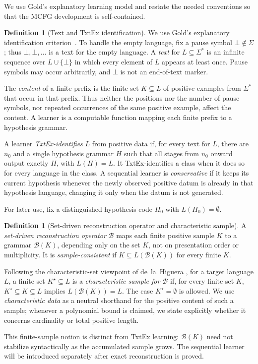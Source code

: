 \documentclass[11pt]{article}
\numberwithin{equation}{section}
\theoremstyle{plain}
\theoremstyle{definition}
\newtheorem{definition}[theorem]{Definition}
\theoremstyle{remark}
\newcommand{\pausesym}{\bot}
\begin{document}
We use Gold's explanatory learning model and restate the needed conventions
so that the MCFG development is self-contained.

\begin{definition}[Text and TxtEx identification]
We use Gold's explanatory identification criterion~\cite{Gold1967}.  To handle the empty language, fix a pause symbol
\(\pausesym\notin\Sigma\); thus
\(\pausesym,\pausesym,\ldots\) is a text for the empty language.
A \emph{text} for \(L\subseteq\Sigma^*\) is an infinite sequence over
\(L\cup\{\pausesym\}\) in which every element of \(L\) appears at least once.
Pause symbols may occur arbitrarily, and \(\pausesym\) is not an end-of-text marker.

The \emph{content} of a finite prefix is the finite set
\(K\subseteq L\) of positive examples from \(\Sigma^*\) that occur in that
prefix.  Thus neither the positions nor the number of pause symbols, nor repeated
occurrences of the same positive example, affect the content.
A learner is a computable function mapping each finite prefix to a hypothesis
grammar.

A learner \emph{TxtEx-identifies} \(L\) from positive data if, for every text
for \(L\), there are \(n_0\) and a single hypothesis grammar \(H\) such that
all stages from \(n_0\) onward output exactly \(H\), with \(L(H)=L\).  It
TxtEx-identifies a class when it does so for every language in the class.  A
sequential learner is \emph{conservative} if it keeps its current hypothesis
whenever the newly observed positive datum is already in that hypothesis
language, changing it only when the datum is not generated.
\end{definition}

For later use, fix a distinguished hypothesis code $H_0$ with
$L(H_0)=\emptyset$.

\begin{definition}[Set-driven reconstruction operator and characteristic sample]
\label{def:characteristic-sample}
A \emph{set-driven reconstruction operator} \(\mathcal B\) maps each finite
positive sample \(K\) to a grammar \(\mathcal B(K)\), depending only on the
set \(K\), not on presentation order or multiplicity.  It is
\emph{sample-consistent} if \(K\subseteq L(\mathcal B(K))\) for every
finite \(K\).

Following the characteristic-set viewpoint of de~la~Higuera
\cite{deLaHiguera1997}, for a target language \(L\), a finite set
\(K^\star\subseteq L\) is a \emph{characteristic sample for \(\mathcal B\)}
if, for every finite set
\(K\), \(K^\star\subseteq K\subseteq L\) implies
\(L(\mathcal B(K))=L\).  The case \(K^\star=\emptyset\) is allowed.  We
use \emph{characteristic data} as a neutral shorthand for the positive content
of such a sample; whenever a polynomial bound is claimed, we state explicitly
whether it concerns cardinality or total positive length.

This finite-sample notion is distinct from TxtEx learning: \(\mathcal B(K)\)
need not stabilize syntactically as the accumulated sample grows.  The
sequential learner will be introduced separately after exact reconstruction is
proved.
\end{definition}
\end{document}
